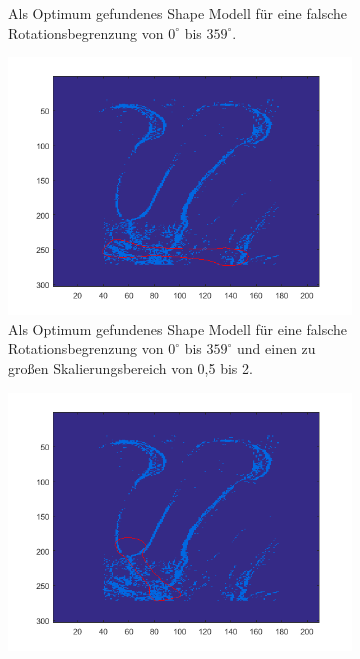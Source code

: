 \documentclass[]{report}
\begin{document}
\begin{enumerate}
\begin{enumerate}
\begin{figure}
\begin{subfigure}[t]{0.3\textwidth}
						\caption{Als Optimum gefundenes Shape Modell für eine falsche Rotationsbegrenzung von $0^\circ$ bis $359^\circ$.}
						\label{fig:image31_wrongRotationRange180}
					\end{subfigure}
					\qquad
					\begin{subfigure}[t]{0.3\textwidth}
						\centering
						\includegraphics[width=\textwidth]{figures/image38_wrongRotationRange90.png}
						\caption{Als Optimum gefundenes Shape Modell für eine falsche Rotationsbegrenzung von $0^\circ$ bis $359^\circ$ und einen zu großen Skalierungsbereich von 0,5 bis 2.}
						\label{fig:image31_wrongRotationRange90}
					\end{subfigure}
					\qquad
					\begin{subfigure}[t]{0.3\textwidth}
						\centering
						\includegraphics[width=\textwidth]{figures/image38_wrongScalingRange.png}

\end{subfigure}
\end{figure}
\end{enumerate}
\end{enumerate}
\end{document}
